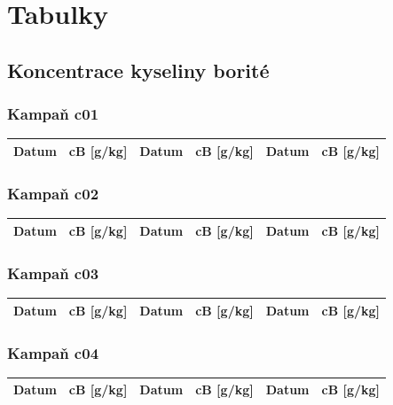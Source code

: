 \documentclass[a4paper,twoside,11pt]{article}
\begin{document}
\section{Tabulky}

\subsection{Koncentrace kyseliny borité}



\subsubsection{Kampaň c01}

\begin{tabular}{|l|l||l|l||l|l|}
\hline
Datum & cB [g/kg] & Datum & cB [g/kg] & Datum & cB [g/kg] \\
\hline

\end{tabular}



\subsubsection{Kampaň c02}

\begin{tabular}{|l|l||l|l||l|l|}
\hline
Datum & cB [g/kg] & Datum & cB [g/kg] & Datum & cB [g/kg] \\
\hline

\end{tabular}



\subsubsection{Kampaň c03}

\begin{tabular}{|l|l||l|l||l|l|}
\hline
Datum & cB [g/kg] & Datum & cB [g/kg] & Datum & cB [g/kg] \\
\hline

\end{tabular}



\subsubsection{Kampaň c04}

\begin{tabular}{|l|l||l|l||l|l|}
\hline
Datum & cB [g/kg] & Datum & cB [g/kg] & Datum & cB [g/kg] \\
\hline

\end{tabular}
\end{document}
